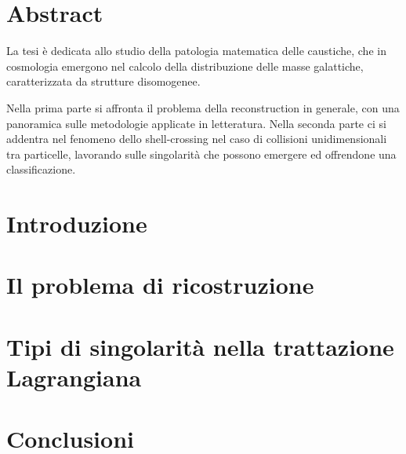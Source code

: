 \documentclass[a4paper,11pt,oneside]{book}
\begin{document}
    

    \mainmatter

    \clearpage %
    \begingroup
    \pagestyle{empty}
    \null
    \newpage
    \endgroup
    
	    
    \chapter*{Abstract}
    La tesi è dedicata allo studio della patologia matematica delle caustiche, che in cosmologia emergono
    nel calcolo della distribuzione delle masse galattiche, caratterizzata da strutture disomogenee.

    Nella prima parte si affronta il problema della reconstruction in generale, con una panoramica sulle 
    metodologie applicate in letteratura. Nella seconda parte ci si addentra nel fenomeno dello 
    shell-crossing nel caso di collisioni unidimensionali tra particelle, lavorando sulle singolarità
    che possono emergere ed offrendone una classificazione.
    


    \tableofcontents

    \chapter*{Introduzione}
    

    \chapter{Il problema di ricostruzione}
    


    \chapter{Tipi di singolarità nella trattazione Lagrangiana}
    


    \chapter*{Conclusioni}

    

    \nocite{*}

    \begin{otherlanguage}{british}
        \printbibliography
    \end{otherlanguage}
\end{document}

